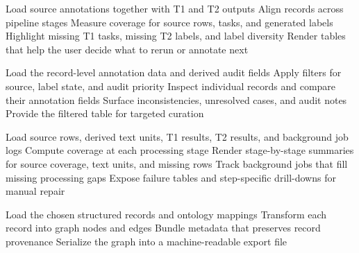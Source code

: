 \begin{algorithm}[H]
Load source annotations together with T1 and T2 outputs\;
Align records across pipeline stages\;
Measure coverage for source rows, tasks, and generated labels\;
Highlight missing T1 tasks, missing T2 labels, and label diversity\;
Render tables that help the user decide what to rerun or annotate next\;
\caption{Ground Truth Run Coverage}
\label{alg:ground-truth-run-coverage}
\end{algorithm}

\begin{algorithm}[H]
Load the record-level annotation data and derived audit fields\;
Apply filters for source, label state, and audit priority\;
Inspect individual records and compare their annotation fields\;
Surface inconsistencies, unresolved cases, and audit notes\;
Provide the filtered table for targeted curation\;
\caption{Ground Truth Record Audit}
\label{alg:ground-truth-record-audit}
\end{algorithm}

\begin{algorithm}[H]
Load source rows, derived text units, T1 results, T2 results, and background job logs\;
Compute coverage at each processing stage\;
Render stage-by-stage summaries for source coverage, text units, and missing rows\;
Track background jobs that fill missing processing gaps\;
Expose failure tables and step-specific drill-downs for manual repair\;
\caption{Ground Truth Step-by-Step Visualizer}
\label{alg:ground-truth-step-visualizer}
\end{algorithm}

\begin{algorithm}[H]
Load the chosen structured records and ontology mappings\;
Transform each record into graph nodes and edges\;
Bundle metadata that preserves record provenance\;
Serialize the graph into a machine-readable export file\;
\caption{Semantic Graph Exporter}
\label{alg:semantic-graph-exporter}
\end{algorithm}

